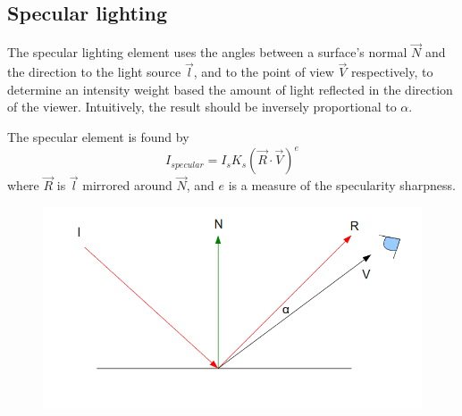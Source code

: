 \subsection{Specular lighting}
The specular lighting element uses the angles between a surface's normal $\vec{N}$
and the direction to the light source $\vec{l}$, and to the point of view $\vec{V}$
respectively, to determine an intensity weight based the amount of light reflected in
the direction of the viewer. Intuitively, the result should be inversely
proportional to $\alpha$.

The specular element is found by
$$I_{specular} = I_{s}K_{s}(\vec{R}\cdot\vec{V})^e$$
where $\vec{R}$ is $\vec{l}$ mirrored around $\vec{N}$, and $e$ is a measure of
the specularity sharpness.

\begin{figure}[hbtp]
\includegraphics{pics/specularAngle.png}
\caption{}
\label{fig:specAng}
\end{figure}
